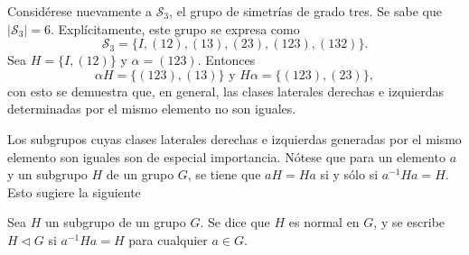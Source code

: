 \begin{ejemplo}
Considérese nuevamente a $\mathcal{S}_3$, el grupo de simetrías de grado tres. Se sabe que $\mid \mathcal{S}_3 \mid = 6$. Explícitamente, este grupo se expresa como \[ \mathcal{S}_3 = \{ I, (12), (13), (23), (123), (132) \} .\]
Sea $H = \{ I, (12) \} $ y $\alpha = (123)$. Entonces \[ \alpha H = \{ (123), (13) \}   \mbox{ y } H\alpha = \{ (123), (23) \} ,\] con esto se demuestra que, en general, las clases laterales derechas e izquierdas determinadas por el mismo elemento no son iguales.
\end{ejemplo}
Los subgrupos cuyas clases laterales derechas e izquierdas generadas por el mismo elemento son iguales son de especial importancia. Nótese que para un elemento $a$ y un subgrupo $H$ de un grupo $G$, se tiene que $aH = Ha$ si y sólo si $a^{-1}Ha=H$. Esto sugiere la siguiente
\begin{definicion}
Sea $H$ un subgrupo de un grupo $G$. Se dice que $H$ es normal en $G$, y se escribe $H \triangleleft G$ si $a^{-1}Ha = H$ para cualquier $a \in G$.
\end{definicion}

